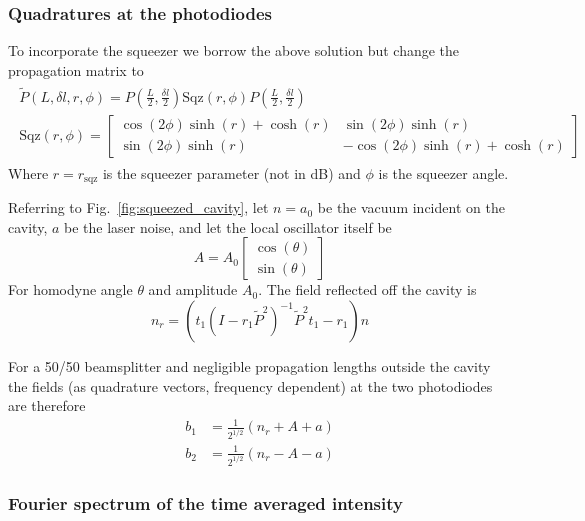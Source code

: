 \documentclass[aps,pra,superscriptaddress,reprint,nofootinbib]{revtex4-1}
\begin{document}
\subsubsection{Quadratures at the photodiodes}

To incorporate the squeezer we borrow the above solution but change the propagation matrix to
\begin{align*}
	\begin{gathered}
	\tilde{P}(L, \delta l, r, \phi) = P\left(\frac{L}{2}, \frac{\delta l}{2}\right) \mathrm{Sqz}(r, \phi) P\left(\frac{L}{2}, \frac{\delta l}{2}\right) \\
	\mathrm{Sqz}(r, \phi) = \begin{bmatrix}
	\cos(2 \phi) \sinh(r) + \cosh(r) & \sin(2\phi) \sinh(r)\\ 
	\sin(2\phi) \sinh(r) & -\cos(2 \phi) \sinh(r) + \cosh(r)
	\end{bmatrix}
	\end{gathered}
\end{align*}
Where $r = r_\mathrm{sqz}$ is the squeezer parameter (not in dB) and $\phi$ is the squeezer angle.


Referring to Fig.~\ref{fig:squeezed_cavity}, let $n = a_0$ be the vacuum incident on the cavity, $a$ be the laser noise, and let the local oscillator itself be
$$A = A_0 \begin{bmatrix}
\cos(\theta)\\ 
\sin(\theta)
\end{bmatrix}$$
For homodyne angle $\theta$ and amplitude $A_0$. The field reflected off the cavity is
$$n_r = \left(t_1 (I - r_1 \tilde{P}^2)^{-1} \tilde{P}^2 t_1 - r_1 \right) n$$


For a 50/50 beamsplitter and negligible propagation lengths outside the cavity the fields (as quadrature vectors, frequency dependent) at the two photodiodes are therefore
\begin{align*}
b_1 &= \frac{1}{2^{1/2}} \left( n_r + A + a\right) \\
b_2 &= \frac{1}{2^{1/2}} \left( n_r - A - a\right)
\end{align*}

\subsubsection{Fourier spectrum of the time averaged intensity}
\end{document}
